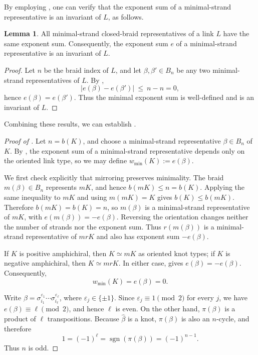 \documentclass[11pt]{article}
\theoremstyle{definition}
\newtheorem{lemma}[lemma]{Lemma}
\begin{document}
By employing , one can verify that the exponent sum of a minimal-strand representative is an invariant of $L$, as follows.

\begin{lemma}\label{lem:writhe-invariant}
All minimal-strand closed-braid representatives of a link $L$ have the same
exponent sum. Consequently, the exponent sum $e$ of a minimal-strand
representative is an invariant of $L$.
\end{lemma}

\begin{proof}
Let $n$ be the braid index of $L$, and let $\beta,\beta'\in B_{n}$ be any two
minimal-strand representatives of $L$. By ,
\[
\bigl|e(\beta)-e(\beta')\bigr|\ \le\ n-n=0 ,
\]
hence $e(\beta)=e(\beta')$. Thus the
minimal exponent sum is well-defined and is an invariant of $L$.
\end{proof}

Combining these results, we can establish .

\begin{proof}[Proof of ]
Let $n=b(K)$, and choose a minimal-strand representative $\beta\in B_n$ of
$K$. By , the exponent sum of a minimal-strand
representative depends only on the oriented link type, so we may define
$w_{\min}(K):=e(\beta)$.

We first check explicitly that mirroring preserves minimality. The braid
$m(\beta)\in B_n$ represents $mK$, and hence $b(mK)\le n=b(K)$. Applying the
same inequality to $mK$ and using $m(mK)=K$ gives $b(K)\le b(mK)$. Therefore
$b(mK)=b(K)=n$, so $m(\beta)$ is a minimal-strand representative of $mK$, with
$e(m(\beta))=-e(\beta)$. Reversing the orientation changes neither the number
of strands nor the exponent sum. Thus $r(m(\beta))$ is a minimal-strand
representative of $mrK$ and also has exponent sum $-e(\beta)$.

If $K$ is positive amphichiral, then $K\simeq mK$ as oriented knot types;
if $K$ is negative amphichiral, then $K\simeq mrK$. In either case,
 gives $e(\beta)=-e(\beta)$. Consequently,
\begin{equation}\label{eq:wmin-zero}
w_{\min}(K)=e(\beta)=0.
\end{equation}

Write $\beta=\sigma_{i_1}^{\varepsilon_1}\cdots
\sigma_{i_\ell}^{\varepsilon_\ell}$, where $\varepsilon_j\in\{\pm1\}$. Since
$\varepsilon_j\equiv1\pmod2$ for every $j$, we have
$e(\beta)\equiv\ell\pmod2$, and hence $\ell$ is even. On the other hand,
$\pi(\beta)$ is a product of $\ell$ transpositions. Because
$\widehat{\beta}$ is a knot, $\pi(\beta)$ is also an $n$-cycle, and therefore
\[
1=(-1)^\ell=\operatorname{sgn}(\pi(\beta))=(-1)^{n-1}.
\]
Thus $n$ is odd.
\end{proof}
\end{document}
